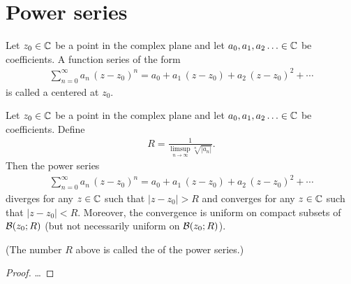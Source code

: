 \section{Power series}

\begin{definition}
  \label{def:power_series}
  Let $z_0 \in \bC$ be a point in the complex plane
  and let $a_0,a_1,a_2\ldots \in \bC$ be coefficients.
  A function series of the form
  \begin{align*}
  \sum_{n=0}^\infty a_n \, (z-z_0)^n
    = a_0 + a_1 \, (z - z_0) + a_2 \, (z - z_0)^2 + \cdots
  \end{align*}
  is called a  centered at $z_0$.
\end{definition}

\begin{lemma}
  \label{lem:radius_of_convergence}
  Let $z_0 \in \bC$ be a point in the complex plane
  and let $a_0,a_1,a_2\ldots \in \bC$ be coefficients.
  Define
  \begin{align*}
    R = \frac{1}{\limsup_{n \to \infty} \sqrt[n]{|a_n|}} .
  \end{align*}
  Then the power series
  \begin{align*}
    \sum_{n=0}^\infty a_n \, (z-z_0)^n
      = a_0 + a_1 \, (z - z_0) + a_2 \, (z - z_0)^2 + \cdots
  \end{align*}
  diverges for any $z \in \bC$ such that $|z-z_0| > R$
  and converges for any $z \in \bC$ such that $|z-z_0| < R$.
  Moreover, the convergence is uniform on compact subsets
  of $\BallRC{R}{z_0}$ (but not necessarily uniform on $\BallRC{R}{z_0}$).

  (The number $R$ above is called the 
  of the power series.)
\end{lemma}
\begin{proof}
  \ldots
\end{proof}

